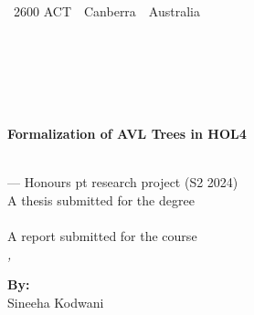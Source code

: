 %
%

\thispagestyle{empty}


\ifStandardTitle %

\noindent
\begin{minipage}[t]{6cm}%
{\footnotesize%
 \\
~2600 ACT~\textbar~Canberra~\textbar~Australia}
\end{minipage}%
\hfill%
\begin{minipage}[b]{10cm}%
\hfill{}
\end{minipage}

\ \\[2em]
\phantom{x} \hfill
\begin{minipage}{58.75 mm}
\raggedright
\bfseries \School\\[.5em]
\mdseries%
\noindent\College
\end{minipage}\\[6 em]
\hfill

\noindent
\parbox{140mm}{\sffamily \bfseries \Huge %
Formalization of AVL Trees in HOL4%
}\\[.75 em]
{--- \ifHonoursThesis Honours  pt research \fi project (S2 2024)}\\[3 em]

\ifHonoursThesis%
A thesis submitted for the degree\\
\emph{\Degree}\\[3 em]
\else%
A report submitted for the course\\
\emph{\CourseCode, \CourseName}\\[3 em]
\fi

\noindent
{\footnotesize \textbf{By:}}\\
Sineeha Kodwani\\[2em]

